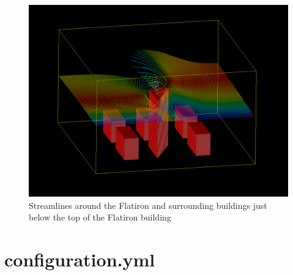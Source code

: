 \begin{figure}[hp]
\centering
\includegraphics[width = \textwidth]{streamlinestop.png}
\caption{Streamlines around the Flatiron and surrounding buildings just below the top of the Flatiron building}
\label{fig:streamlinestop}
\end{figure}
%
%
\clearpage\section{configuration.yml}
